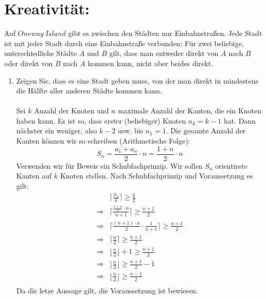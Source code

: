     \section*{Kreativit\"at:}
    Auf $Oneway \> Island$ gibt es zwischen den Städten nur Einbahnstraßen. Jede Stadt ist mit jeder
	Stadt durch eine Einbahnstraße verbunden: Für zwei beliebige, unterschiedliche Städte $A$ und
	$B$ gilt, dass man entweder direkt von $A$ nach $B$ oder direkt von $B$ nach $A$ kommen kann,
	nicht aber beides direkt.
    \begin{enumerate}[label=(\alph*)]
    	\item Zeigen Sie, dass es eine Stadt geben muss, von der man direkt in mindestens die Hälfte
		aller anderen Städte kommen kann.\\\\
		Sei $k$ Anzahl der Knoten und $n$ maximale Anzahl der Kanten, die ein Knoten haben kann. 
		Es ist so, dass erster (beliebiger) Knoten $n_k = k-1$ hat. Dann n\"achster ein weniger, 
		also $k-2$ usw. bis $n_1 = 1$. 
		Die gesamte Anzahl der Kanten k\"onnen wir so schreiben (Arithmetische Folge): 
		\[S_n = \frac{a_1+a_n}{2}\cdot n = \frac{1+n}{2}\cdot n\]
		Verwenden wir f\"ur Beweis ein Schubfachprinzip. Wir sollen $S_n$ orientirete Kanten auf $k$ 
		Knoten stellen. Nach Schubfachprinzip und Voraussetzung es gilt: 
		\begin{align*}
			&\bigg\lceil\frac{S_n}{k}\bigg\rceil \geq \frac{k}{2} \\
			\Rightarrow &\bigg\lceil\frac{\frac{1+n}{2}\cdot n}{n+1}\bigg\rceil \geq \frac{n+1}{2}\\
			\Rightarrow &\bigg\lceil\frac{(n+1)\cdot n}{2} \cdot \frac{1}{n+1}\bigg\rceil \geq \frac{n+1}{2}\\
			\Rightarrow &\bigg\lceil\frac{n}{2}\bigg\rceil \geq \frac{n+1}{2}\\
			\Rightarrow &\bigg\lfloor\frac{n}{2}\bigg\rfloor + 1 \geq \frac{n+1}{2}\\
			\Rightarrow &\bigg\lfloor\frac{n}{2}\bigg\rfloor \geq \frac{n+1}{2} - 1\\
			\Rightarrow &\bigg\lfloor\frac{n}{2}\bigg\rfloor \geq \frac{n-1}{2}\\
		\end{align*}
		Da die letze Aussage gilt, die Voraussetzung ist bewiesen.	
    \end{enumerate}
